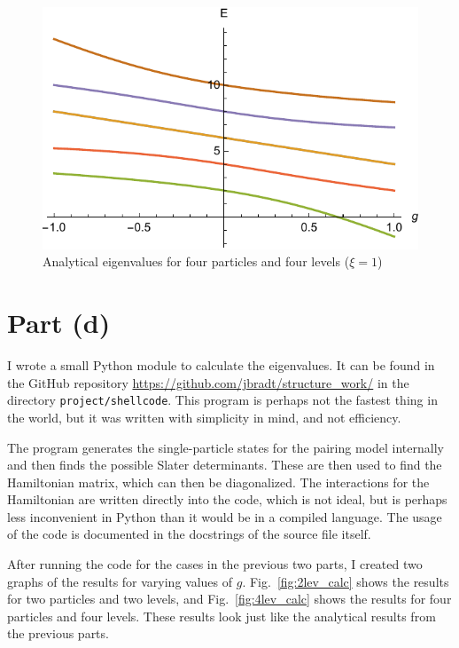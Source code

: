 \documentclass{article}
\begin{document}
	\begin{figure}[p]
		\centering
		\includegraphics{sol4.pdf}
		\caption{Analytical eigenvalues for four particles and four levels ($\xi=1$)}
		\label{fig:4lev_analytical}
	\end{figure}

\section*{Part (d)}
	
	I wrote a small Python module to calculate the eigenvalues. It can be found in the GitHub repository \url{https://github.com/jbradt/structure_work/} in the directory \texttt{project/shellcode}. This program is perhaps not the fastest thing in the world, but it was written with simplicity in mind, and not efficiency.

	The program generates the single-particle states for the pairing model internally and then finds the possible Slater determinants. These are then used to find the Hamiltonian matrix, which can then be diagonalized. The interactions for the Hamiltonian are written directly into the code, which is not ideal, but is perhaps less inconvenient in Python than it would be in a compiled language. The usage of the code is documented in the docstrings of the source file itself.

	After running the code for the cases in the previous two parts, I created two graphs of the results for varying values of $g$. Fig.~\ref{fig:2lev_calc} shows the results for two particles and two levels, and Fig.~\ref{fig:4lev_calc} shows the results for four particles and four levels. These results look just like the analytical results from the previous parts.
\end{document}
